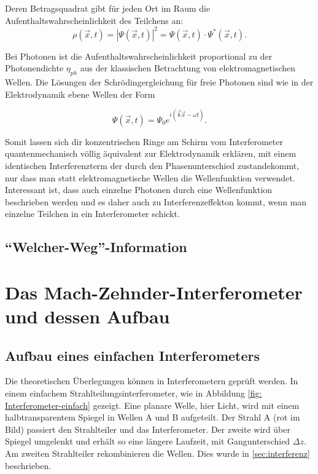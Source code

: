 \documentclass[a4paper,ngerman]{scrartcl}
\begin{document}
Deren Betragsquadrat gibt für jeden Ort im Raum die Aufenthaltswahrscheinlichkeit des Teilchens an:
\begin{equation}
  \rho(\vec{x},t) = |\Psi(\vec{x},t)|^2 = \Psi(\vec{x},t) \cdot \Psi^*(\vec{x},t).
\end{equation}

Bei Photonen ist die Aufenthaltswahrscheinlichkeit proportional zu der Photonendichte $\eta_{ph}$ aus der klassischen Betrachtung von elektromagnetischen Wellen. Die Lösungen der Schrödingergleichung für freie Photonen sind wie in der Elektrodynamik ebene Wellen der Form

\begin{equation}
  \Psi(\vec{x},t) = \Psi_0 e^{i(\vec{k}\vec{x}-\omega t)}.
\end{equation}

Somit lassen sich dir konzentrischen Ringe am Schirm vom Interferometer quantenmechanisch völlig äquivalent zur Elektrodynamik erklären,
mit einem identischen Interferenzterm der durch den Phasenunterschied zustandekommt,
nur dass man statt elektromagnetische Wellen die Wellenfunktion verwendet. \\

Interessant ist, dass auch einzelne Photonen durch eine Wellenfunktion beschrieben werden und es daher auch zu Interferenzeffekton kommt,
wenn man einzelne Teilchen in ein Interferometer schickt.


\subsection{"`Welcher-Weg"'-Information}
\label{sec:welcher-weg}


\clearpage
\section{Das Mach-Zehnder-Interferometer und dessen Aufbau}
\label{sec:mach-zehnder}

\subsection{Aufbau eines einfachen Interferometers}
\label{ssec:interferomter-einfach}

Die theoretischen Überlegungen können in Interferometern geprüft werden. 
In einem einfachem Strahlteilungsinterferometer, wie in Abbildung \ref{fig: Interferometer-einfach} gezeigt. 
Eine planare Welle, hier Licht, wird mit einem halbtransparentem Spiegel in Wellen A und B aufgeteilt. Der Strahl A (rot im Bild) passiert den Strahlteiler und das Interferometer. 
Der zweite wird über Spiegel umgelenkt und erhält so eine längere Laufzeit, mit Gangunterschied $\Delta z$. 
Am zweiten Strahlteiler rekombinieren die Wellen. Dies wurde in \ref{sec:interferenz} beschrieben.
\end{document}
